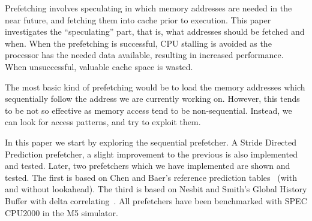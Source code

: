 Prefetching involves speculating in which memory addresses are needed
in the near future, and fetching them into cache prior to
execution. This paper investigates the ``speculating'' part, that is,
what addresses should be fetched and when. When the prefetching is
successful, CPU stalling is avoided as the processor has the needed
data available, resulting in increased performance. When unsuccessful,
valuable cache space is wasted.

The most basic kind of prefetching would be to load the memory
addresses which sequentially follow the address we are currently
working on. However, this tends to be not so effective as memory
access tend to be non-sequential. Instead, we can look for access
patterns, and try to exploit them.

In this paper we start by exploring the sequential prefetcher. A
Stride Directed Prediction prefetcher, a slight improvement to the
previous is also implemented and tested. Later, two prefetchers which we have implemented are shown
and tested. The first is based on Chen and Baer's reference
prediction tables~\cite{chen_baer_1995} (with and without
lookahead). The third is based on Nesbit and Smith's Global History
Buffer with delta correlating~\cite{nesbit_smith_2005}. All
prefetchers have been benchmarked with SPEC CPU2000 in the M5
simulator.

